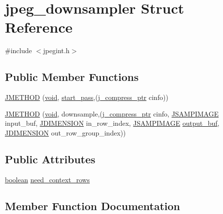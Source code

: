 \hypertarget{structjpeg__downsampler}{}\section{jpeg\+\_\+downsampler Struct Reference}
\label{structjpeg__downsampler}


{\ttfamily \#include $<$jpegint.\+h$>$}

\subsection*{Public Member Functions}
\begin{DoxyCompactItemize}
\item 
\hyperlink{structjpeg__downsampler_a1ca33229e63cdb80020c714f1cd28ea0}{J\+M\+E\+T\+H\+O\+D} (\hyperlink{png_8h_aa8c59027f9ab2769342f248709d68d17}{void}, \hyperlink{jddctmgr_8c_a1964f006adb8fb80f57e455f6452aec1}{start\+\_\+pass},(\hyperlink{jpeglib_8h_add2a072c54e3a51550f4975f7ddb91e7}{j\+\_\+compress\+\_\+ptr} cinfo))
\item 
\hyperlink{structjpeg__downsampler_a611ebcb0ae11e4d1c6ba4222caacaec4}{J\+M\+E\+T\+H\+O\+D} (\hyperlink{png_8h_aa8c59027f9ab2769342f248709d68d17}{void}, downsample,(\hyperlink{jpeglib_8h_add2a072c54e3a51550f4975f7ddb91e7}{j\+\_\+compress\+\_\+ptr} cinfo, \hyperlink{jpeglib_8h_a4bf858e4d42202287e786bdec2f3b62b}{J\+S\+A\+M\+P\+I\+M\+A\+G\+E} input\+\_\+buf, \hyperlink{jmorecfg_8h_a04ed4674f6f1d0d50ec241531e38274f}{J\+D\+I\+M\+E\+N\+S\+I\+O\+N} in\+\_\+row\+\_\+index, \hyperlink{jpeglib_8h_a4bf858e4d42202287e786bdec2f3b62b}{J\+S\+A\+M\+P\+I\+M\+A\+G\+E} \hyperlink{jdct_8h_ad7e4660a191b1a791748dd44d5a7a0ec}{output\+\_\+buf}, \hyperlink{jmorecfg_8h_a04ed4674f6f1d0d50ec241531e38274f}{J\+D\+I\+M\+E\+N\+S\+I\+O\+N} out\+\_\+row\+\_\+group\+\_\+index))
\end{DoxyCompactItemize}
\subsection*{Public Attributes}
\begin{DoxyCompactItemize}
\item 
\hyperlink{jmorecfg_8h_a7c6368b321bd9acd0149b030bb8275ed}{boolean} \hyperlink{structjpeg__downsampler_ab177a119691924a4bdd2223df7f5ed08}{need\+\_\+context\+\_\+rows}
\end{DoxyCompactItemize}


\subsection{Member Function Documentation}
\hypertarget{structjpeg__downsampler_a1ca33229e63cdb80020c714f1cd28ea0}{}
